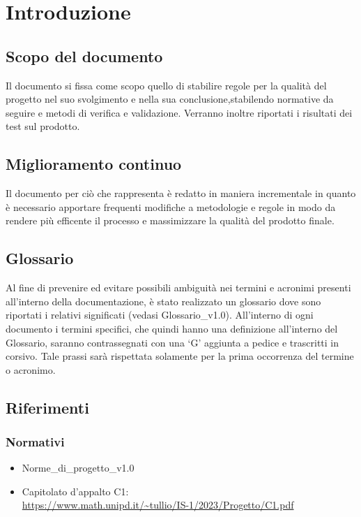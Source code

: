 \chapter{Introduzione}

\section{Scopo del documento}
Il documento si fissa come scopo quello di stabilire regole per la qualità del progetto nel suo svolgimento e nella sua conclusione,stabilendo normative da seguire e metodi di verifica e validazione. Verranno inoltre riportati i risultati dei test sul prodotto.
\section{Miglioramento continuo}
Il documento per ciò che rappresenta è redatto in maniera incrementale in quanto è necessario apportare frequenti modifiche a metodologie e regole in modo da rendere più efficente il processo e massimizzare la qualità del prodotto finale.

\section{Glossario}
Al fine di prevenire ed evitare possibili ambiguità nei termini e acronimi presenti all’interno della documentazione, è stato realizzato un glossario dove sono riportati i relativi significati (vedasi Glossario\_v1.0). All’interno di ogni documento i termini specifici, che quindi hanno una definizione all’interno del Glossario, saranno contrassegnati con una ‘G’ aggiunta a pedice e trascritti in corsivo. Tale prassi sarà rispettata solamente per la prima occorrenza del termine o acronimo.

\section{Riferimenti}
\subsection{Normativi}
\begin{itemize}
    \item Norme\_di\_progetto\_v1.0
    \item Capitolato d'appalto C1: \\ \url{https://www.math.unipd.it/~tullio/IS-1/2023/Progetto/C1.pdf}
\end{itemize}

